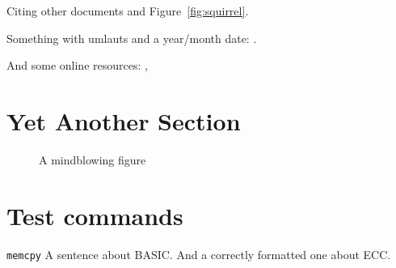 Citing \cite{bellard2005qfa} other documents \cite{bellard2005qfa, boileau06}
and Figure~\ref{fig:squirrel}.

Something with umlauts and a year/month date:
\cite{becher04:_feurig_hacken_mit_firew}.

And some online resources: \cite{green04}, \cite{patent:4819234}

\section{Yet Another Section}


\begin{figure}[tbp]
 \caption{A mindblowing figure}
 \label{fig:todo}
\end{figure}

\section{Test commands}

\drops \LLinux \NOVA \QEMU
\texttt{memcpy}
A sentence about BASIC. And a correctly formatted one about ECC\@.

\cleardoublepage
